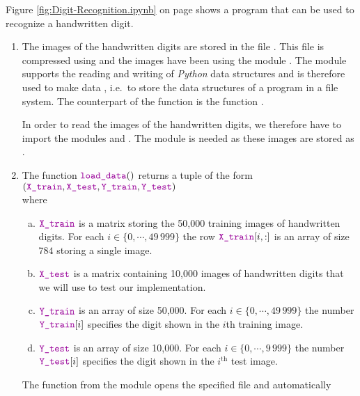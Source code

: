 \noindent
Figure \ref{fig:Digit-Recognition.ipynb} on page \pageref{fig:Digit-Recognition.ipynb} shows a program that can
be used to recognize a handwritten digit.
\begin{enumerate}
\item The images of the handwritten digits are stored in the file .  This file is compressed
      using  and the images have been  using the module
      .  The module
       supports the reading and writing of \textsl{Python} data structures and is therefore
      used to make data , i.e.~to store the data structures of a program in a file system.
      The counterpart of the function  is the function .

      In order to read the images of the handwritten digits, we therefore have to import the modules
       and .  The module  is needed as these images are stored as
       .  
\item The function $\mytt{load\_data}()$ returns a tuple of the form
      \\[0.2cm]
      \hspace*{1.3cm}
      $ \ds (\mytt{X\_train}, \mytt{X\_test}, \mytt{Y\_train}, \mytt{Y\_test}) $
      \\[0.2cm]
      where 
      \begin{enumerate}[(a)]
      \item $\mytt{X\_train}$ is a matrix storing the 50,000 training images of handwritten digits.
            For each $i \in \{0,\cdots,49\,999\}$ the row $\mytt{X\_train}[i, :]$ is an array of size $784$ storing a single image.
      \item $\mytt{X\_test}$ is a matrix containing 10,000 images of handwritten digits that we will use to
            test our implementation.
      \item $\mytt{Y\_train}$ is an array of size 50,000. For each $i \in \{0,\cdots,49\,999\}$ the number $\mytt{Y\_train}[i]$
            specifies the digit shown in the $i$th training image.
      \item $\mytt{Y\_test}$ is an array of size 10,000. For each $i \in \{0,\cdots,9\,999\}$ the number $\mytt{Y\_test}[i]$
            specifies the digit shown in the $i^{\mathrm{th}}$ test image.
      \end{enumerate}
      The function  from the module  opens the specified file and automatically

\end{enumerate}
